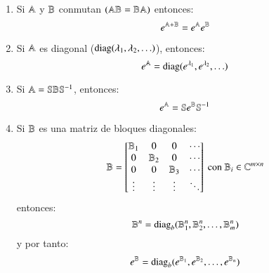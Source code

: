 \begin{pro}
\begin{enumerate}
    \item Si $\mathbb{A}$ y $\mathbb{B}$ conmutan $(\mathbb{A}\mathbb{B} = \mathbb{B}\mathbb{A})$ entonces:
    $$
        e^{\mathbb{A}+\mathbb{B}} = e^{\mathbb{A}} e^{\mathbb{B}}
    $$
    \item Si $\mathbb{A}$ es diagonal ($\operatorname{diag}(\lambda_1, \lambda_2,\ldots)$), entonces:
    $$
        e^{\mathbb{A}} = \operatorname{diag}(e^{\lambda_1}, e^{\lambda_2}, \ldots)
    $$
    \item Si $\mathbb{A} = \mathbb{S} \mathbb{B} \mathbb{S}^{-1}$, entonces:
    $$
        e^{\mathbb{A}} = \mathbb{S} e^{\mathbb{B}} \mathbb{S}^{-1}
    $$
    \item Si $\mathbb{B}$ es una matriz de bloques diagonales:
    $$
        \mathbb{B} = \left[\begin{matrix}\mathbb{B}_1 & 0 & 0 & \cdots \\
            0  & \mathbb{B}_2 & 0 & \cdots\\
            0 & 0 & \mathbb{B}_3 & \cdots\\
            \vdots & \vdots & \vdots & \ddots\end{matrix}\right] \text{ con } \mathbb{B}_i \in \mathbb{C}^{m\times n}
    $$
    entonces:
    $$
        \mathbb{B}^n = \operatorname{diag}_b(\mathbb{B}_1^n, \mathbb{B}_2^n, \ldots, \mathbb{B}_m^n)
    $$
    y por tanto:
    $$
        e^{\mathbb{B}} = \operatorname{diag}_b(e^{\mathbb{B}_1},e^{\mathbb{B}_2},\ldots,e^{\mathbb{B}_n})
    $$
\end{enumerate}
\end{pro}

